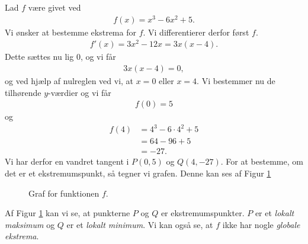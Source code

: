 \begin{exa}
	Lad $f$ være givet ved
	\begin{align*}
		f(x) = x^3-6x^2+5.
	\end{align*}
	Vi ønsker at bestemme ekstrema for $f$. Vi differentierer derfor først $f$.
	\begin{align*}
		f'(x) = 3x^2-12x = 3x(x-4).
	\end{align*}
	Dette sættes nu lig $0$, og vi får
	\begin{align*}
		3x(x-4) = 0, 
	\end{align*}
	og ved hjælp af nulreglen ved vi, at $x=0$ eller $x = 4$. Vi bestemmer nu de tilhørende $y$-værdier og vi får
	\begin{align*}
		f(0) = 5
	\end{align*}
	og 
	\begin{align*}
		f(4) &= 4^3 - 6\cdot 4^2+5\\
		&= 64-96+5\\
		&= -27.
	\end{align*}
	Vi har derfor en vandret tangent i $P(0,5)$ og $Q(4,-27)$. For at bestemme, om det er et ekstremumspunkt, så tegner vi grafen. Denne kan ses af Figur \ref{fig:ekstrema}
	\begin{figure}[H]
		\centering
		\caption{Graf for funktionen $f$.}
		\label{fig:ekstrema}
	\end{figure}
\end{exa}
Af Figur \ref{fig:ekstrema} kan vi se, at punkterne $P$ og $Q$ er ekstremumspunkter. $P$ er et \textit{lokalt maksimum} og $Q$ er et \textit{lokalt minimum}. Vi kan også se, at $f$ ikke har nogle 
\textit{globale ekstrema}.

